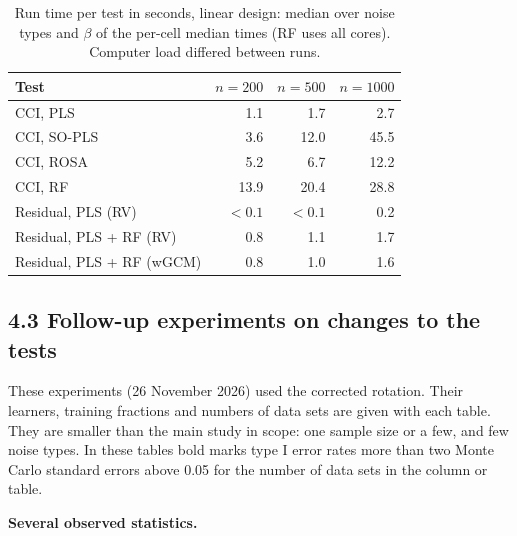 \documentclass[10pt,leqno]{amsart}
\begin{document}
\begin{table}[H]
\caption{Run time per test in seconds, linear design: median over noise types and $\beta$ of the per-cell median times (RF uses all cores). Computer load differed between runs.}
\label{tab:time}
\small
\begin{tabular}{lrrr}
\toprule
Test & $n=200$ & $n=500$ & $n=1000$ \\
\midrule
CCI, PLS & 1.1 & 1.7 & 2.7 \\
CCI, SO-PLS & 3.6 & 12.0 & 45.5 \\
CCI, ROSA & 5.2 & 6.7 & 12.2 \\
CCI, RF & 13.9 & 20.4 & 28.8 \\
Residual, PLS (RV) & $<0.1$ & $<0.1$ & 0.2 \\
Residual, PLS + RF (RV) & 0.8 & 1.1 & 1.7 \\
Residual, PLS + RF (wGCM) & 0.8 & 1.0 & 1.6 \\
\bottomrule
\end{tabular}
\end{table}

\subsection*{4.3 Follow-up experiments on changes to the tests}

These experiments (26 November 2026) used the corrected rotation. Their learners,
training fractions and numbers of data sets are given with each table. They are
smaller than the main study in scope: one sample size or a few, and few noise types.
In these tables bold marks type I error rates more than two Monte Carlo standard
errors above 0.05 for the number of data sets in the column or table.

\par\medskip\noindent\textbf{Several observed statistics.}\par\nopagebreak
\end{document}
